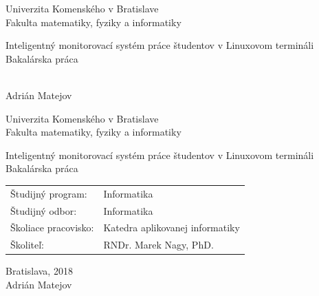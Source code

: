 \documentclass[12pt, oneside]{book}
\def\mfrok{2018}
\def\mfnazov{Inteligentný monitorovací systém práce študentov v Linuxovom termináli}
\def\mftyp{Bakalárska práca}
\def\mfautor{Adrián Matejov}
\def\mfskolitel{RNDr. Marek Nagy, PhD.}
\def\mfkonzultant{tit. Meno Priezvisko, tit. }
\def\mfmiesto{Bratislava, \mfrok}
\def\mfodbor{Informatika}
\def\program{Informatika}
\def\mfpracovisko{Katedra aplikovanej informatiky}
\theoremstyle{definition}
\begin{document}
     
\frontmatter


\thispagestyle{empty}

\begin{center}
\sc\large
Univerzita Komenského v Bratislave\\
Fakulta matematiky, fyziky a informatiky

\vfill

{\LARGE\mfnazov}\\
\mftyp
\end{center}

\vfill

{\sc\large 
\noindent \mfrok\\
\mfautor
}

\eject %


\thispagestyle{empty}
\noindent

\begin{center}
\sc  
\large
Univerzita Komenského v Bratislave\\
Fakulta matematiky, fyziky a informatiky

\vfill

{\LARGE\mfnazov}\\
\mftyp
\end{center}

\vfill

\noindent
\begin{tabular}{ll}
Študijný program: & \program \\
Študijný odbor: & \mfodbor \\
Školiace pracovisko: & \mfpracovisko \\
Školiteľ: & \mfskolitel \\
\end{tabular}

\vfill


\noindent \mfmiesto\\
\mfautor

\eject %




\end{document}
